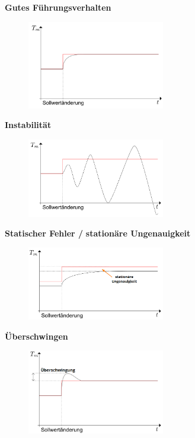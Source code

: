 \documentclass[
  10pt,
  a4paper,
  twocolumn]{article}
\numberwithin{equation}{section}
\begin{document}
\textbf{Gutes Führungsverhalten}

\begin{figure}[H]

{\centering \includegraphics[width=6cm,height=\textheight]{images/fuhrungsverhalten/gutes_verhalten.png}

}

\end{figure}

\textbf{Instabilität}

\begin{figure}[H]

{\centering \includegraphics[width=6cm,height=\textheight]{images/fuhrungsverhalten/instabil.png}

}

\end{figure}

\textbf{Statischer Fehler /} \textbf{stationäre Ungenauigkeit}

\begin{figure}[H]

{\centering \includegraphics[width=6cm,height=\textheight]{images/fuhrungsverhalten/stationary.png}

}

\end{figure}

\textbf{Überschwingen}

\begin{figure}[H]

{\centering \includegraphics[width=6cm,height=\textheight]{images/fuhrungsverhalten/uberschwingung.png}

}

\end{figure}
\end{document}
